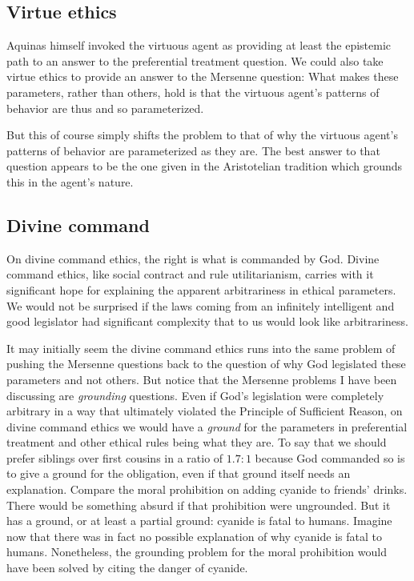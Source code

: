 \subsection{Virtue ethics}
Aquinas himself invoked the virtuous agent as providing at least the epistemic path to an answer to the preferential treatment
question. We could also take virtue ethics to provide an answer to the Mersenne question: What makes these parameters, rather
than others, hold is that the virtuous agent's patterns of behavior are thus and so parameterized.

But this of course simply shifts the problem to that of why the virtuous agent's patterns of behavior are parameterized as
they are. The best answer to that question appears to be the one given in the Aristotelian tradition which grounds this in
the agent's nature.

\subsection{Divine command}
On divine command ethics, the right is what is commanded by God.
Divine command ethics, like social contract and rule utilitarianism, carries with it significant hope for explaining the apparent
arbitrariness in ethical parameters. We would not be surprised if the laws coming from an infinitely intelligent and good legislator 
had significant complexity that to us would look like arbitrariness. 

It may initially seem the divine command ethics runs into the same problem of pushing the Mersenne questions back to the
question of why God legislated these parameters and not others. But notice that the Mersenne problems I have been discussing
are \textit{grounding} questions. Even if God's legislation were completely arbitrary in a way that ultimately violated the
Principle of Sufficient Reason, on divine command ethics we would have a \textit{ground} for the parameters in preferential
treatment and other ethical rules being what they are. To say that we should prefer siblings over first cousins in a ratio
of $1.7:1$ because God commanded so is to give a ground for the obligation, even if that ground itself needs an explanation.
Compare the moral prohibition on adding cyanide to friends' drinks. There would be something absurd if that prohibition were
ungrounded. But it has a ground, or at least a partial ground: cyanide is fatal to humans. Imagine now that there was in fact 
no possible explanation of why cyanide is fatal to humans. Nonetheless, the grounding problem for the moral prohibition would
have been solved by citing the danger of cyanide.

